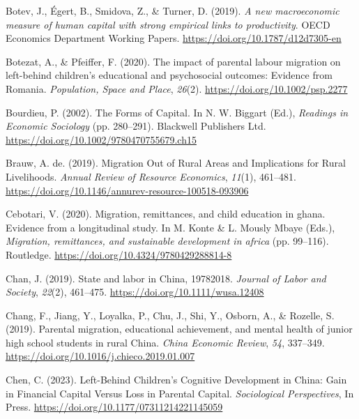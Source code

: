 \documentclass[
  man,floatsintext]{apa7}
\newlength{\cslhangindent}
\newlength{\cslentryspacingunit} %
\newenvironment{CSLReferences}[2] %
 {%
  \setlength{\parindent}{0pt}
  \ifodd #1
  \let\oldpar\par
  \def\par{\hangindent=\cslhangindent\oldpar}
  \fi
  \setlength{\parskip}{#2\cslentryspacingunit}
 }%
 {}
\begin{document}
\begin{CSLReferences}{1}{0}
\leavevmode{}%
Botev, J., Égert, B., Smidova, Z., \& Turner, D. (2019). \emph{A new macroeconomic measure of human capital with strong empirical links to productivity}. OECD Economics Department Working Papers. \url{https://doi.org/10.1787/d12d7305-en}

\leavevmode{}%
Botezat, A., \& Pfeiffer, F. (2020). The impact of parental labour migration on left{-}behind children's educational and psychosocial outcomes: Evidence from Romania. \emph{Population, Space and Place}, \emph{26}(2). \url{https://doi.org/10.1002/psp.2277}

\leavevmode{}%
Bourdieu, P. (2002). The Forms of Capital. In N. W. Biggart (Ed.), \emph{Readings in Economic Sociology} (pp. 280--291). Blackwell Publishers Ltd. \url{https://doi.org/10.1002/9780470755679.ch15}

\leavevmode{}%
Brauw, A. de. (2019). Migration Out of Rural Areas and Implications for Rural Livelihoods. \emph{Annual Review of Resource Economics}, \emph{11}(1), 461--481. \url{https://doi.org/10.1146/annurev-resource-100518-093906}

\leavevmode{}%
Cebotari, V. (2020). Migration, remittances, and child education in ghana. Evidence from a longitudinal study. In M. Konte \& L. Mously Mbaye (Eds.), \emph{Migration, remittances, and sustainable development in africa} (pp. 99--116). Routledge. \url{https://doi.org/10.4324/9780429288814-8}

\leavevmode{}%
Chan, J. (2019). State and labor in China, 1978{\textendash}2018. \emph{Journal of Labor and Society}, \emph{22}(2), 461--475. \url{https://doi.org/10.1111/wusa.12408}

\leavevmode{}%
Chang, F., Jiang, Y., Loyalka, P., Chu, J., Shi, Y., Osborn, A., \& Rozelle, S. (2019). Parental migration, educational achievement, and mental health of junior high school students in rural China. \emph{China Economic Review}, \emph{54}, 337--349. \url{https://doi.org/10.1016/j.chieco.2019.01.007}

\leavevmode{}%
Chen, C. (2023). Left-Behind Children{'}s Cognitive Development in China: Gain in Financial Capital Versus Loss in Parental Capital. \emph{Sociological Perspectives}, In Press. \url{https://doi.org/10.1177/07311214221145059}


\end{CSLReferences}
\end{document}
